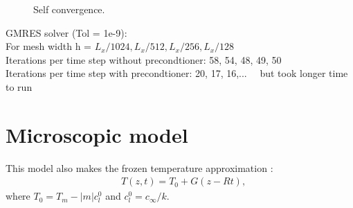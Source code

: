 \documentclass[a4paper,12pt]{article}
\begin{document}
\begin{figure}[!ht]
     \hfill
     \caption{Self convergence. }
     \label{fig:nolat_convergence}
   \end{figure}
GMRES solver (Tol = 1e-9):\\
For mesh width h =  $ L_x/1024, L_x/512, L_x/256, L_x/128 $\\
Iterations per time step without precondtioner: 58, 54, 48, 49, 50\\
Iterations per time step with precondtioner: 20, 17, 16,...      \ \        but took longer time to run

\newpage

\section{Microscopic model}


This model also makes the frozen temperature approximation \cite{Tourret2015,Echebarria2010,Plapp2007,Echebarria2004}:
\begin{align}
    & T(z,t) = T_0 + G(z-Rt),
\end{align}
where $T_0 = T_m - |m|c_l^0$ and $c_l^0 = c_{\infty}/ k$. 
\end{document}
